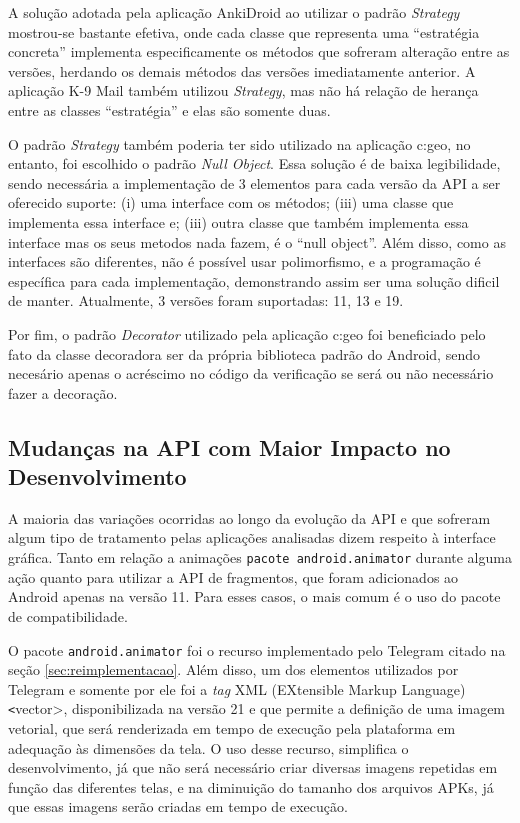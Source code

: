 A solução adotada pela aplicação AnkiDroid ao utilizar o padrão \textit{Strategy}
mostrou-se bastante efetiva, onde cada classe  que representa uma “estratégia concreta”
implementa especificamente os métodos que sofreram alteração entre as versões,
herdando os demais métodos das versões imediatamente anterior.
A aplicação K-9 Mail também utilizou \textit{Strategy}, mas não há relação de
herança entre as classes “estratégia” e elas são somente duas.

O padrão \textit{Strategy} também poderia ter sido utilizado na aplicação c:geo,
no entanto, foi escolhido o padrão \textit{Null Object}. Essa solução é de baixa
legibilidade, sendo necessária a implementação de 3 elementos para cada versão da
API a ser oferecido suporte: (i) uma interface com os métodos; (iii) uma classe
que implementa essa interface e; (iii) outra classe que também implementa essa interface
mas os seus metodos nada fazem, é o “null object”.
Além disso, como as interfaces são diferentes, não é possível usar polimorfismo,
e a programação é específica para cada implementação, demonstrando assim ser uma
solução dificil de manter. Atualmente, 3 versões foram suportadas: 11, 13 e 19.

Por fim, o padrão \textit{Decorator} utilizado pela aplicação c:geo foi beneficiado
pelo fato da classe decoradora ser da própria biblioteca padrão do Android,
sendo necesário apenas o acréscimo no código da verificação se será ou não
necessário fazer a decoração.

\subsection{Mudanças na API com Maior Impacto no Desenvolvimento}
\label{sec:mudancas}

A maioria das variações ocorridas ao longo da evolução da API e que sofreram algum
tipo de tratamento pelas aplicações analisadas dizem respeito à interface gráfica.
Tanto em relação a animações \texttt{pacote android.animator} durante alguma ação
quanto para utilizar a API de fragmentos, que foram adicionados ao Android apenas
na versão 11. Para esses casos, o mais comum é o uso do pacote de compatibilidade.

O pacote \texttt{android.animator} foi o recurso implementado pelo Telegram citado
na seção \ref{sec:reimplementacao}. Além disso, um dos elementos utilizados por
Telegram e somente por ele foi a \textit{tag} XML (EXtensible Markup Language) \texttt<vector>,
disponibilizada
na versão 21 e que permite a definição de uma imagem vetorial, que será renderizada
em tempo de execução pela plataforma em adequação às dimensões da tela. O uso desse
recurso, simplifica o desenvolvimento, já que não será necessário criar diversas
imagens repetidas em função das diferentes telas, e na diminuição do tamanho dos
arquivos APKs, já que essas imagens serão criadas em tempo de execução.

